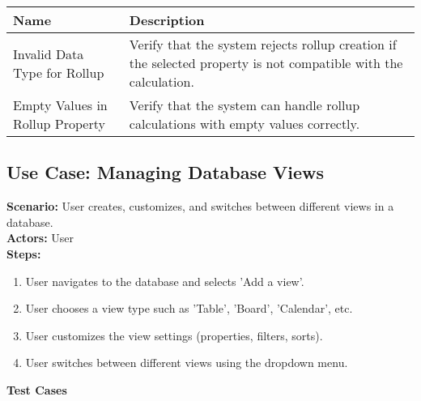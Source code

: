 \documentclass{article}
\begin{document}
            \begin{longtable}{|p{}|p{}|}
            \hline
            \textbf{Name} & \textbf{Description} \\
            \hline
            Invalid Data Type for Rollup & Verify that the system rejects rollup creation if the selected property is not compatible with the calculation. \\
\hline
Empty Values in Rollup Property & Verify that the system can handle rollup calculations with empty values correctly. \\
\hline
\end{longtable}\subsection{\textbf{Use Case: Managing Database Views}}
\textbf{Scenario:} User creates, customizes, and switches between different views in a database.\\
\textbf{Actors:} User\\
\textbf{Steps:}
\begin{enumerate}
\item User navigates to the database and selects 'Add a view'.
\item User chooses a view type such as 'Table', 'Board', 'Calendar', etc.
\item User customizes the view settings (properties, filters, sorts).
\item User switches between different views using the dropdown menu.
\end{enumerate}
\textbf{Test Cases}
\end{document}
